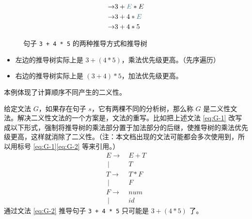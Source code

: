 \documentclass[UTF8]{ctexart}
\newcommand\OR{\ |\ }
\newcommand\Emph[1]{\textcolor{cyan!80!black}{#1}}
\newcommand\Notes[1]{\textcolor{yellow!50!black}{\small #1}}
\begin{document}
\begin{figure}[htb]
\begin{minipage}[t]{.49\textwidth}
\begin{align*}
        \to  & 3+\hightlight{E}*E \\
        \to  & 3+4*\hightlight{E} \\
        \to  & 3+4*5 \\
    \end{align*}
\end{minipage}
    \caption{句子 \texttt{3 + 4 * 5} 的两种推导方式和推导树}\label{fig:tuidao}
\end{figure}

\begin{itemize}[itemsep=0pt, parsep=0pt, leftmargin=1.5cm]
    \item 左边的推导树实际上是 $3+(4*5)$，乘法优先级更高。（先序遍历）
    \item 右边的推导树实际上是 $(3+4)*5$，加法优先级更高。
\end{itemize}
本例体现了计算顺序不同产生的二义性。

给定文法 $G$，如果存在句子 $s$，它有两棵不同的分析树，那么称 $G$ 是\Emph{二义性文法}。解决二义性文法的一个方案是，文法的重写。比如把上述文法 \eqref{eq:G-1} 改写成以下形式，强制将推导树的乘法部分置于加法部分的后继，使推导树的乘法优先级更高，这样就消除了二义性。\Notes{（注：本文档出现的文法可能都会多次使用到，所以用标号 \eqref{eq:G-1}\eqref{eq:G-2} 等来引用。）}
\begin{equation}\label{eq:G-2}
\begin{split}
   E\to\  & E+T \\
    \OR & T \\
   T\to\  & T*F \\
    \OR & F \\
   F\to\  & num\\
    \OR & id
\end{split}
\end{equation}
通过文法 \eqref{eq:G-2} 推导句子 \verb!3 + 4 * 5! 只可能是 $3+(4*5)$ 了。
\end{document}
